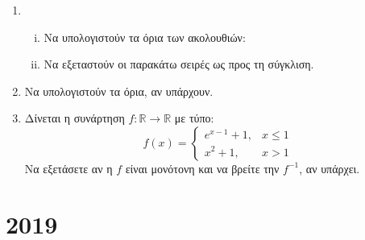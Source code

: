 \begin{enumerate}
    \item 
        \begin{enumerate}[i)]
            \item Να υπολογιστούν τα όρια των ακολουθιών:

            \item Να εξεταστούν οι παρακάτω σειρές ως προς τη σύγκλιση.
        \end{enumerate}

    \item Να υπολογιστούν τα όρια, αν υπάρχουν.


    \item Δίνεται η συνάρτηση $ f \colon \mathbb{R} \to \mathbb{R} $ με τύπο:
        \[
            f(x) = 
            \begin{cases} 
                e^{x-1}+1, & x \leq 1 \\ 
                x^{2}+1, & x >1 
            \end{cases}  
        \] 
        Να εξετάσετε αν η $f$ είναι μονότονη και να βρείτε την $ f^{-1} $, αν 
        υπάρχει.
\end{enumerate}

\section*{2019}


